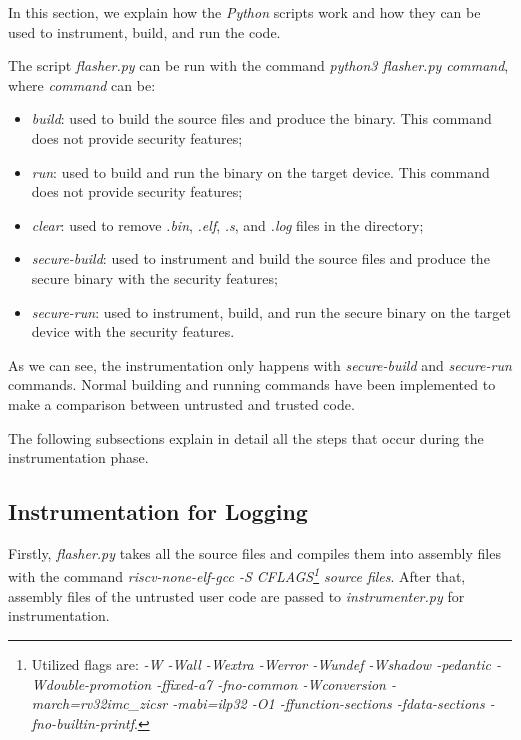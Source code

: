 In this section, we explain how the \textit{Python} scripts work and how they
can be used to instrument, build, and run the code.

The script \textit{flasher.py} can be run with the command \textit{python3
flasher.py command}, where \textit{command} can be:
\begin{itemize}[noitemsep]
  \item \textit{build}: used to build the source files and produce the binary.
    This command does not provide security features;

  \item \textit{run}: used to build and run the binary on the target device.
    This command does not provide security features;

  \item \textit{clear}: used to remove \textit{.bin}, \textit{.elf}, \textit{.s},
    and \textit{.log} files in the directory;

  \item \textit{secure-build}: used to instrument and build the source files and
    produce the secure binary with the security features;

  \item \textit{secure-run}: used to instrument, build, and run the secure binary
    on the target device with the security features.
\end{itemize}

As we can see, the instrumentation only happens with \textit{secure-build} and
\textit{secure-run} commands. Normal building and running commands have been
implemented to make a comparison between untrusted and trusted code.

The following subsections explain in detail all the steps that occur during the
instrumentation phase.

\subsection{Instrumentation for Logging}
\label{subsec:logging}

Firstly, \textit{flasher.py} takes all the source files and compiles them into assembly
files with the command \textit{riscv-none-elf-gcc -S CFLAGS\footnote{Utilized
flags are: \textit{-W -Wall -Wextra -Werror -Wundef -Wshadow -pedantic -Wdouble-promotion
-ffixed-a7 -fno-common -Wconversion -march=rv32imc\_zicsr -mabi=ilp32 -O1 -ffunction-sections
-fdata-sections -fno-builtin-printf}.} source files}. After that, assembly files
of the untrusted user code are passed to \textit{instrumenter.py} for instrumentation.

